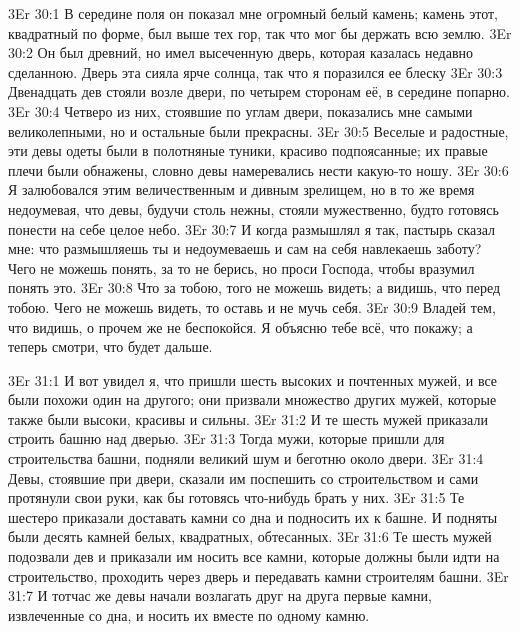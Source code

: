 \vs 3Er 30:1
В середине поля он показал
мне огромный белый камень; камень этот, квадратный по форме, был выше тех гор,
так что мог бы держать всю землю.
\vs 3Er 30:2
Он был древний, но имел
высеченную дверь, которая казалась недавно сделанною. Дверь эта сияла ярче
солнца, так что я поразился ее блеску
\vs 3Er 30:3
Двенадцать дев стояли
возле двери, по четырем сторонам её, в середине попарно.
\vs 3Er 30:4
Четверо из них, стоявшие
по углам двери, показались мне самыми великолепными, но и остальные были
прекрасны.
\vs 3Er 30:5
Веселые и радостные, эти
девы одеты были в полотняные туники, красиво подпоясанные; их правые плечи
были обнажены, словно девы намеревались нести какую-то ношу.
\vs 3Er 30:6
Я залюбовался этим
величественным и дивным зрелищем, но в то же время недоумевая, что девы,
будучи столь нежны, стояли мужественно, будто готовясь понести на себе целое
небо.
\vs 3Er 30:7
И когда размышлял я так,
пастырь сказал мне: что размышляешь ты и недоумеваешь и сам на себя навлекаешь
заботу? Чего не можешь понять, за то не берись, но проси Господа, чтобы
вразумил понять это.
\vs 3Er 30:8
Что за тобою, того не
можешь видеть; а видишь, что перед тобою. Чего не можешь видеть, то оставь и
не мучь себя.
\vs 3Er 30:9
Владей тем, что видишь, о
прочем же не беспокойся. Я объясню тебе всё, что покажу; а теперь смотри, что
будет дальше.

\vs 3Er 31:1
И вот увидел я, что пришли
шесть высоких и почтенных мужей, и все были похожи один на другого; они
призвали множество других мужей, которые также были высоки, красивы и сильны.
\vs 3Er 31:2
И те шесть мужей приказали
строить башню над дверью.
\vs 3Er 31:3
Тогда мужи, которые пришли
для строительства башни, подняли великий шум и беготню около двери.
\vs 3Er 31:4
Девы, стоявшие при двери,
сказали им поспешить со строительством и сами протянули свои руки, как бы
готовясь что-нибудь брать у них.
\vs 3Er 31:5
Те шестеро приказали
доставать камни со дна и подносить их к башне. И подняты были десять камней
белых, квадратных, обтесанных.
\vs 3Er 31:6
Те шесть мужей подозвали
дев и приказали им носить все камни, которые должны были идти на
строительство, проходить через дверь и передавать камни строителям башни.
\vs 3Er 31:7
И тотчас же девы начали
возлагать друг на друга первые камни, извлеченные со дна, и носить их вместе
по одному камню.

